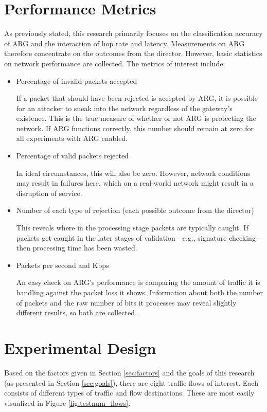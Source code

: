 \section{Performance Metrics}
\label{sec:metrics}
\par As previously stated, this research primarily focuses on the classification accuracy of \ac{ARG} and the interaction of hop rate and latency. Measurements on \ac{ARG} therefore concentrate on the outcomes from the director. However, basic statistics on network performance are collected. The metrics of interest include:

\begin{itemize}
\item Percentage of invalid packets accepted
	\par If a packet that should have been rejected is accepted by \ac{ARG}, it is possible for an attacker to sneak into the network regardless of the gateway's existence. This is the true measure of whether or not \ac{ARG} is protecting the network. If \ac{ARG} functions correctly, this number should remain at zero for all experiments with \ac{ARG} enabled.

\item Percentage of valid packets rejected
	\par In ideal circumstances, this will also be zero. However, network conditions may result in failures here, which on a real-world network might result in a disruption of service. 

\item Number of each type of rejection (each possible outcome from the director)
	\par This reveals where in the processing stage packets are typically caught. If packets get caught in the later stages of validation---e.g., signature checking---then processing time has been wasted.

\item Packets per second and \acf{Kbps}
	\par An easy check on \ac{ARG}'s performance is comparing the amount of traffic it is handling against the packet loss it shows. Information about both the number of packets and the raw number of bits it processes may reveal slightly different results, so both are collected.
\end{itemize}

\section{Experimental Design}
\label{sec:exp_design}
\par Based on the factors given in Section \ref{sec:factors} and the goals of this research (as presented in Section \ref{sec:goals}), there are eight traffic flows of interest. Each consists of different types of traffic and flow destinations. These are most easily visualized in Figure \ref{fig:testnum_flows}.

